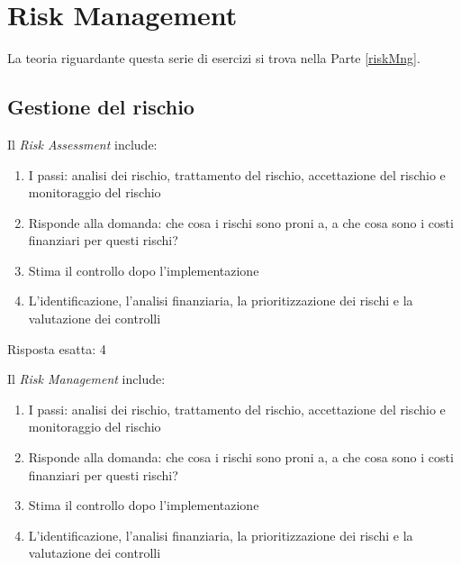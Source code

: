 \chapter{Risk Management}

La teoria riguardante questa serie di esercizi si trova nella
Parte \ref{riskMng}.

\section{Gestione del rischio}

\label{esGestRisk}

\begin{Exercise} [
  title={Quiz},
  label={gestRisk1}
  ]

  \Question Il \textit{Risk Assessment} include:

\begin{enumerate}
 \item I passi: analisi dei rischio, trattamento del rischio, accettazione del
rischio e monitoraggio del rischio
 \item Risponde alla domanda: che cosa i rischi sono proni a, a che cosa sono i
costi finanziari per questi rischi?
 \item Stima il controllo dopo l'implementazione
 \item L'identificazione, l'analisi finanziaria, la prioritizzazione dei rischi
e la valutazione dei controlli
\end{enumerate}

\end{Exercise}


\begin{Answer} [
  ref={gestRisk1},
  number={1}
  ]

  \Question Risposta esatta: 4

\end{Answer}


\begin{Exercise} [
  title={Quiz},
  label={gestRisk2}
  ]

  \Question Il \textit{Risk Management} include:
\begin{enumerate}
 \item I passi: analisi dei rischio, trattamento del rischio, accettazione del
rischio e monitoraggio del rischio
 \item Risponde alla domanda: che cosa i rischi sono proni a, a che cosa sono i
costi finanziari per questi rischi?
 \item Stima il controllo dopo l'implementazione
 \item L'identificazione, l'analisi finanziaria, la prioritizzazione dei rischi
e la valutazione dei controlli
\end{enumerate}
\end{Exercise}


